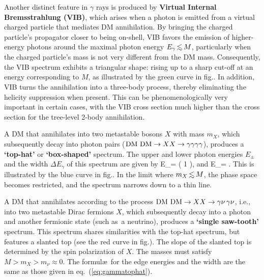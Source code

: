 \smallskip
Another distinct feature in $\gamma$ rays is produced by \textbf{Virtual Internal Bremsstrahlung (VIB)}, which arises when a photon is emitted from a virtual charged particle that mediates DM annihilation. 
By bringing the charged particle's propagator closer to being on-shell, 
VIB favors the emission of higher-energy photons around the maximal photon energy $E_\gamma\circa{<} M$,
particularly when the charged particle's  mass is not very different from the DM mass.
Consequently, the VIB spectrum exhibits a triangular shape: rising up to a sharp cut-off at an energy corresponding to $M$, as illustrated by the green curve in fig.. 
In addition, VIB turns the annihilation into a three-body process, thereby eliminating the helicity suppression when present.
This can be phenomenologically very important in certain cases, with 
the VIB cross section much higher than the cross section for the tree-level 2-body annihilation.






\medskip

A DM that annihilates into two metastable bosons $X$ with mass $m_X$, which subsequently decay into photon pairs 
($\hbox{DM DM} \to X X \to \gamma\gamma\gamma\gamma$),
produces a {\bf `top-hat'} or {\bf `box-shaped'} spectrum. 
The  upper and lower photon energies $E_\pm$ and the width $\Delta E_\gamma$ of this spectrum are given by 
\beq
E_\pm =  \left( 1\pm {} \right), \qquad \hbox{and}\qquad
\Delta E_\gamma = .
\label{eq:gammatophat}
\eeq
This is illustrated by the blue curve in fig.. 
In the limit where $m_X \circa{<} M$, the phase space becomes restricted, and the spectrum narrows down to a thin line. 


\medskip

A DM that annihilates according to the process $\hbox{DM DM} \to X X \to \gamma \nu \, \gamma \nu$, i.e., 
into two metastable Dirac fermions $X$, which subsequently decay into a photon and another fermionic state (such as~a neutrino), produces a {\bf `single saw-tooth'} spectrum.
This spectrum shares similarities with the top-hat spectrum, but  features a slanted top
(see the red curve in fig.).
The slope of the slanted top is determined by the spin polarization of $X$.
The masses must satisfy $M > m_X > m_\nu \approx 0$. The formul\ae\ for the edge energies and the width are the same as those given in  eq.~(\ref{eq:gammatophat}).



